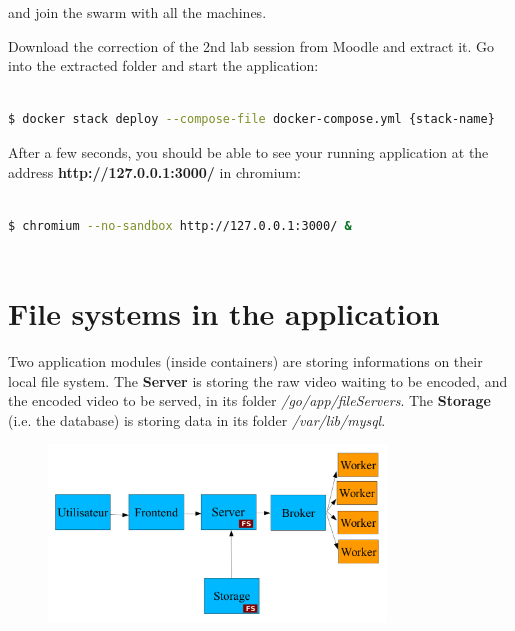 \documentclass[a4paper,11pt]{exam}
\begin{document}
and join the swarm with all the machines.

Download the correction of the 2nd lab session from Moodle and extract it. 
Go into the extracted folder and start the application:

\begin{lstlisting}[frame=single,language={sh}]  % Start your code-block

$ docker stack deploy --compose-file docker-compose.yml {stack-name}

\end{lstlisting}

After a few seconds, you should be able to see your running application at the address \textbf{http://127.0.0.1:3000/} in chromium:

\begin{lstlisting}[frame=single,language={sh}]  % Start your code-block

$ chromium --no-sandbox http://127.0.0.1:3000/ &
		
\end{lstlisting}

\clearpage

\section{File systems in the application}

Two application modules (inside containers) are storing informations on their local file system. 
The \textbf{Server} is storing the raw video waiting to be encoded, and the encoded video to be served, in its folder \textit{/go/app/fileServers}. 
The \textbf{Storage} (i.e. the database) is storing data in its folder \textit{/var/lib/mysql}. 

\begin{figure}[!ht]
	\centering
	\includegraphics[width=0.8\textwidth]{fig/architecture.png}
	\label{fig:architecture}
\end{figure}
\end{document}
